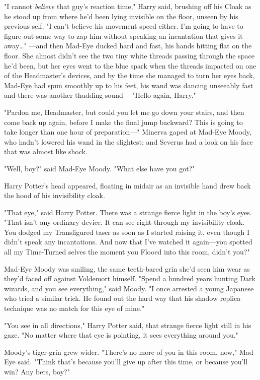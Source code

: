 "I cannot \emph{believe} that guy's reaction time," Harry said, brushing off
his Cloak as he stood up from where he'd been lying invisible on the floor,
unseen by his previous self. "I can't believe his movement speed either. I'm
going to have to figure out some way to zap him without speaking an incantation
that gives it away{\ldots}"
\later
---and then Mad-Eye ducked hard and fast, his hands hitting flat on the floor.
She almost didn't see the two tiny white threads passing through the space he'd
been, but her eyes went to the blue spark when the threads impacted on one of
the Headmaster's devices, and by the time she managed to turn her eyes back,
Mad-Eye had spun smoothly up to his feet, his wand was dancing unseeably fast
and there was another thudding sound---
\later
"Hello again, Harry."

"Pardon me, Headmaster, but could you let me go down your stairs, and then come
back up again, before I make the final jump backward? This is going to take
longer than one hour of preparation---"
\later
Minerva gaped at Mad-Eye Moody, who hadn't lowered his wand in the slightest;
and Severus had a look on his face that was almost like shock.

"Well, boy?" said Mad-Eye Moody. "What else have you got?"

Harry Potter's head appeared, floating in midair as an invisible hand drew back
the hood of his invisibility cloak.

"That eye," said Harry Potter. There was a strange fierce light in the boy's
eyes. "That isn't any ordinary device. It can see right through my invisibility
cloak. You dodged my Transfigured taser as soon as I started raising it, even
though I didn't speak any incantations. And now that I've watched it
again---you spotted all my Time-Turned selves the moment you Flooed into this
room, didn't you?"

Mad-Eye Moody was smiling, the same teeth-bared grin she'd seen him wear as
they'd faced off against Voldemort himself. "Spend a hundred years hunting Dark
wizards, and you see everything," said Moody. "I once arrested a young Japanese
who tried a similar trick. He found out the hard way that his shadow replica
technique was no match for this eye of mine."

"You see in all directions," Harry Potter said, that strange fierce light still
in his gaze. "No matter where that eye is pointing, it sees everything around
you."

Moody's tiger-grin grew wider. "There's no more of you in this room, now,"
Mad-Eye said. "Think that's because you'll give up after this time, or because
you'll win? Any bets, boy?"

